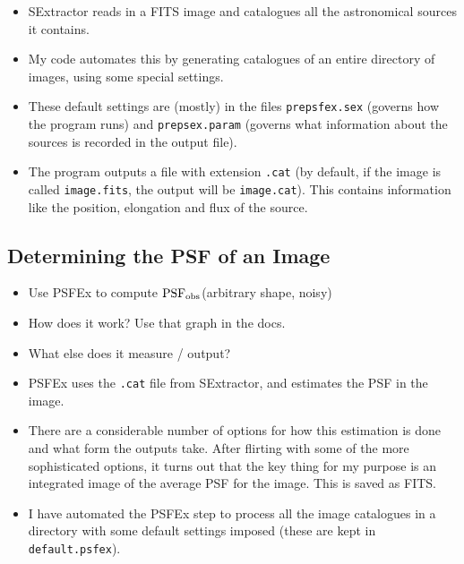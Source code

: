 \documentclass[letterpaper, 11pt]{article}
\def\psfobs{\ensuremath{{\rm PSF_{obs}}}\xspace}
\begin{document}
\begin{itemize}
	\item SExtractor reads in a FITS image and catalogues all the astronomical sources it contains.
	\item My code automates this by generating catalogues of an entire directory of images, using some special settings.
	\item These default settings are (mostly) in the files \texttt{prepsfex.sex} (governs how the program runs) and \texttt{prepsex.param} (governs what information about the sources is recorded in the output file).
	\item The program outputs a file with extension \texttt{.cat} (by default, if the image is called \texttt{image.fits}, the output will be \texttt{image.cat}). This contains information like the position, elongation and flux of the source.
\end{itemize}

\subsection{Determining the PSF of an Image}
\label{sec:psfex}

\begin{itemize}
	\item Use PSFEx to compute \psfobs (arbitrary shape, noisy)
	\item How does it work? Use that graph in the docs.
	\item What else does it measure / output?
\end{itemize}

\vspace{1cm}

\begin{itemize}
	\item PSFEx uses the \texttt{.cat} file from SExtractor, and estimates the PSF in the image.
	\item There are a considerable number of options for how this estimation is done and what form the outputs take. After flirting with some of the more sophisticated options, it turns out that the key thing for my purpose is an integrated image of the average PSF for the image. This is saved as FITS.
	\item I have automated the PSFEx step to process all the image catalogues in a directory with some default settings imposed (these are kept in \texttt{default.psfex}).
\end{itemize}
\end{document}
